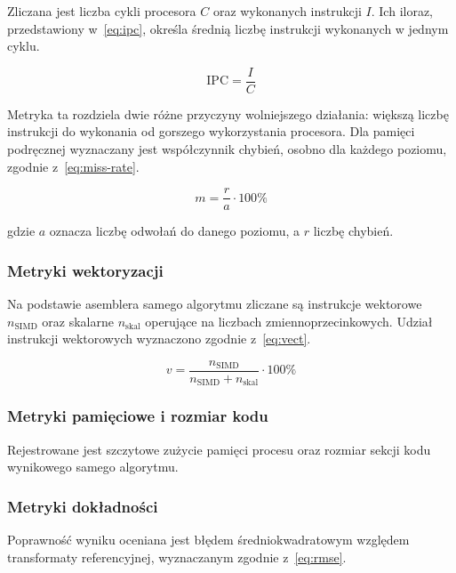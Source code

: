 Zliczana jest liczba cykli procesora $C$ oraz wykonanych instrukcji $I$.
Ich iloraz, przedstawiony w~\cref{eq:ipc}, określa średnią liczbę instrukcji
wykonanych w jednym cyklu.

\begin{equation}\label{eq:ipc}
\mathrm{IPC} = \frac{I}{C}
\end{equation}

Metryka ta rozdziela dwie różne przyczyny wolniejszego działania: większą
liczbę instrukcji do wykonania od gorszego wykorzystania procesora. Dla
pamięci podręcznej wyznaczany jest współczynnik chybień, osobno dla każdego
poziomu, zgodnie z~\cref{eq:miss-rate}.

\begin{equation}\label{eq:miss-rate}
m = \frac{r}{a} \cdot 100\%
\end{equation}

gdzie $a$ oznacza liczbę odwołań do danego poziomu, a $r$ liczbę chybień.

\subsubsection{Metryki wektoryzacji}

Na podstawie asemblera samego algorytmu zliczane są instrukcje wektorowe
$n_{\mathrm{SIMD}}$ oraz skalarne $n_{\mathrm{skal}}$ operujące na liczbach
zmiennoprzecinkowych. Udział instrukcji wektorowych wyznaczono zgodnie
z~\cref{eq:vect}.

\begin{equation}\label{eq:vect}
v = \frac{n_{\mathrm{SIMD}}}{n_{\mathrm{SIMD}} + n_{\mathrm{skal}}} \cdot 100\%
\end{equation}


\subsubsection{Metryki pamięciowe i rozmiar kodu}

Rejestrowane jest szczytowe zużycie pamięci procesu oraz rozmiar sekcji kodu
wynikowego samego algorytmu.

\subsubsection{Metryki dokładności}

Poprawność wyniku oceniana jest błędem średniokwadratowym względem
transformaty referencyjnej, wyznaczanym zgodnie z~\cref{eq:rmse}.

